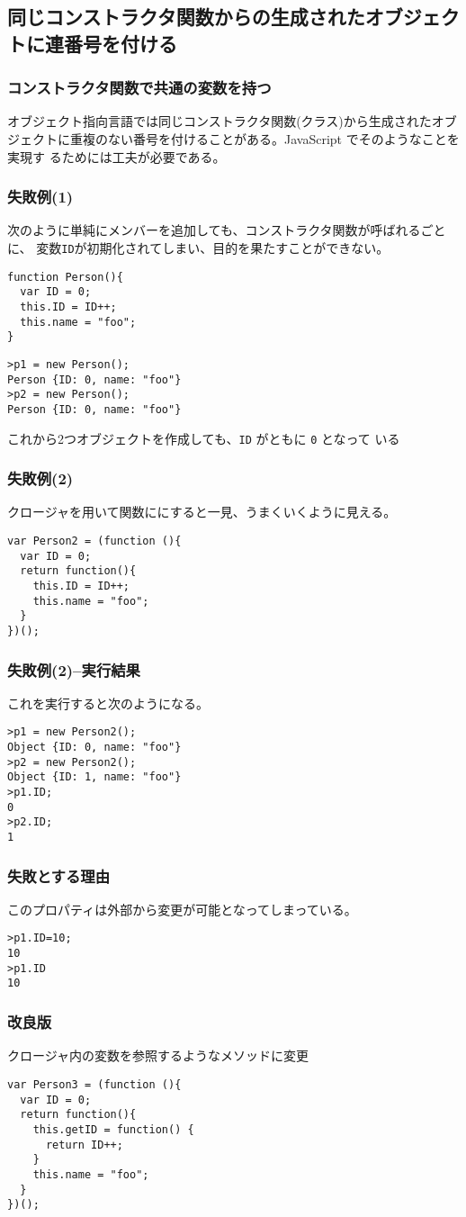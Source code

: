 \subsection[オブジェクトに連番号を付ける]{同じコンストラクタ関数からの生成されたオブジェクトに連番号を付ける}
\begin{frame}[containsverbatim]
\frametitle{コンストラクタ関数で共通の変数を持つ}
オブジェクト指向言語では同じコンストラクタ関数(クラス)から生成されたオブ
ジェクトに重複のない番号を付けることがある。JavaScript でそのようなことを実現す
るためには工夫が必要である。
\end{frame}
\begin{frame}[containsverbatim]
\frametitle{失敗例(1)}
次のように単純にメンバーを追加しても、コンストラクタ関数が呼ばれるごとに、
変数\texttt{ID}が初期化されてしまい、目的を果たすことができない。
\begin{Verbatim}
function Person(){
  var ID = 0;
  this.ID = ID++;
  this.name = "foo";
}
\end{Verbatim}
\begin{Verbatim}
>p1 = new Person();
Person {ID: 0, name: "foo"}
>p2 = new Person();
Person {ID: 0, name: "foo"}
\end{Verbatim}
これから2つオブジェクトを作成しても、\texttt{ID} がともに \texttt{0} となって
 いる
\end{frame}
\begin{frame}[containsverbatim]
\frametitle{失敗例(2)}
クロージャを用いて関数ににすると一見、うまくいくように見える。
\begin{Verbatim}
var Person2 = (function (){
  var ID = 0;
  return function(){
    this.ID = ID++;
    this.name = "foo";
  }
})();
\end{Verbatim}
\end{frame}
\begin{frame}[containsverbatim]
\frametitle{失敗例(2)--実行結果}
これを実行すると次のようになる。
\begin{Verbatim}
>p1 = new Person2();
Object {ID: 0, name: "foo"}
>p2 = new Person2();
Object {ID: 1, name: "foo"}
>p1.ID;
0
>p2.ID;
1
\end{Verbatim}
\end{frame}
\begin{frame}[containsverbatim]
\frametitle{失敗とする理由}
このプロパティは外部から変更が可能となってしまっている。
\begin{Verbatim}
>p1.ID=10;
10
>p1.ID
10
\end{Verbatim}
\end{frame}
\begin{frame}[containsverbatim]
\frametitle{改良版}
 クロージャ内の変数を参照するようなメソッドに変更
\begin{Verbatim}
var Person3 = (function (){
  var ID = 0;
  return function(){
    this.getID = function() {
      return ID++;
    }
    this.name = "foo";
  }
})();
\end{Verbatim}
\end{frame}
